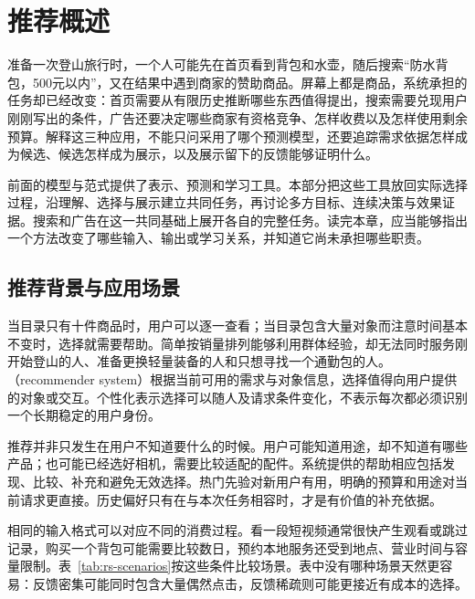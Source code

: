 \chapter{推荐概述}
\label{chap:rs-overview}

准备一次登山旅行时，一个人可能先在首页看到背包和水壶，随后搜索“防水背包，500元以内”，又在结果中遇到商家的赞助商品。屏幕上都是商品，系统承担的任务却已经改变：首页需要从有限历史推断哪些东西值得提出，搜索需要兑现用户刚刚写出的条件，广告还要决定哪些商家有资格竞争、怎样收费以及怎样使用剩余预算。解释这三种应用，不能只问采用了哪个预测模型，还要追踪需求依据怎样成为候选、候选怎样成为展示，以及展示留下的反馈能够证明什么。

前面的模型与范式提供了表示、预测和学习工具。本部分把这些工具放回实际选择过程，沿理解、选择与展示建立共同任务，再讨论多方目标、连续决策与效果证据。搜索和广告在这一共同基础上展开各自的完整任务。读完本章，应当能够指出一个方法改变了哪些输入、输出或学习关系，并知道它尚未承担哪些职责。

\section{推荐背景与应用场景}
\label{sec:rs-background}

当目录只有十件商品时，用户可以逐一查看；当目录包含大量对象而注意时间基本不变时，选择就需要帮助。简单按销量排列能够利用群体经验，却无法同时服务刚开始登山的人、准备更换轻量装备的人和只想寻找一个通勤包的人。（recommender system）根据当前可用的需求与对象信息，选择值得向用户提供的对象或交互。个性化表示选择可以随人及请求条件变化，不表示每次都必须识别一个长期稳定的用户身份。

推荐并非只发生在用户不知道要什么的时候。用户可能知道用途，却不知道有哪些产品；也可能已经选好相机，需要比较适配的配件。系统提供的帮助相应包括发现、比较、补充和避免无效选择。热门先验对新用户有用，明确的预算和用途对当前请求更直接。历史偏好只有在与本次任务相容时，才是有价值的补充依据。

相同的输入格式可以对应不同的消费过程。看一段短视频通常很快产生观看或跳过记录，购买一个背包可能需要比较数日，预约本地服务还受到地点、营业时间与容量限制。表~\ref{tab:rs-scenarios}按这些条件比较场景。表中没有哪种场景天然更容易：反馈密集可能同时包含大量偶然点击，反馈稀疏则可能更接近有成本的选择。

